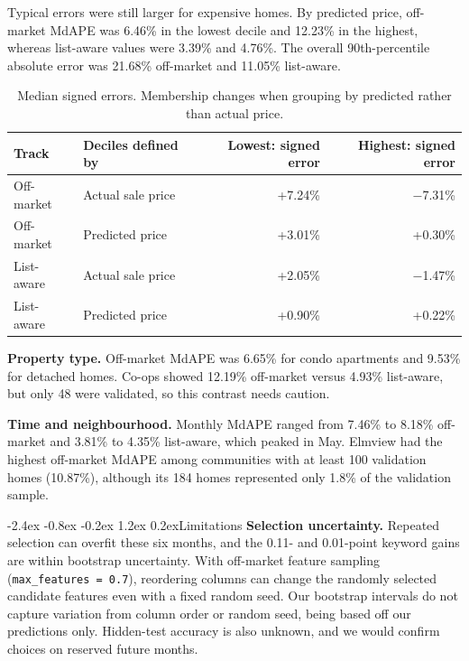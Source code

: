 \documentclass[11pt,a4paper]{article}
\makeatletter
\renewcommand\section{\@startsection{section}{1}{\z@}
  {-2.4ex \@plus -0.8ex \@minus -0.2ex}
  {1.2ex \@plus 0.2ex}{\normalfont\Large\bfseries}}
\makeatother
\begin{document}
Typical errors were still larger for expensive homes. By predicted price, off-market MdAPE was 6.46\% in the lowest
decile and 12.23\% in the highest, whereas list-aware values were 3.39\% and 4.76\%.
The overall 90th-percentile absolute error was 21.68\% off-market and 11.05\% list-aware.

\begin{table}[ht]
\centering
\small
\begin{tabular}{llrr}
\toprule
Track & Deciles defined by & Lowest: signed error & Highest: signed error \\
\midrule
Off-market & Actual sale price & +7.24\% & $-$7.31\% \\
Off-market & Predicted price & +3.01\% & +0.30\% \\
List-aware & Actual sale price & +2.05\% & $-$1.47\% \\
List-aware & Predicted price & +0.90\% & +0.22\% \\
\bottomrule
\end{tabular}
\caption{Median signed errors. Membership changes when grouping by predicted rather than actual price.}
\end{table}

\textbf{Property type.} Off-market MdAPE was 6.65\% for condo apartments and 9.53\% for detached
homes. Co-ops showed 12.19\% off-market versus 4.93\% list-aware, but only 48 were validated,
so this contrast needs caution.

\begin{samepage}
\textbf{Time and neighbourhood.} Monthly MdAPE ranged from 7.46\% to 8.18\% off-market and
3.81\% to 4.35\% list-aware, which peaked in May. Elmview had the highest off-market MdAPE among
communities with at least 100 validation homes (10.87\%), although its 184 homes represented only
1.8\% of the validation sample.
\par
\end{samepage}

\section{Limitations}
\textbf{Selection uncertainty.} Repeated selection can overfit these six months, and the 0.11- and
0.01-point keyword gains are within bootstrap uncertainty. With off-market feature sampling
(\texttt{max\_features = 0.7}), reordering columns can change the randomly selected candidate
features even with a fixed random seed. Our bootstrap intervals do not capture variation from column
order or random seed, being based off our predictions only. Hidden-test accuracy is also unknown, and we would
confirm choices on reserved future months.
\end{document}
